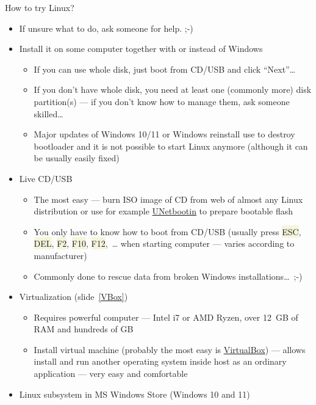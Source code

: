 \documentclass[compress, xelatex, 11pt, xcolor=svgnames, aspectratio=169, url={hyphens, lowtilde}]{beamer}
\renewcommand{\texttt}[1]{\colorbox{Beige}{{\ttfamily #1}}}
\begin{document}

\begin{frame}[allowframebreaks]{How to try Linux?}
	\begin{itemize}
		\item If unsure what to do, ask someone for help. ;-)
		\item Install it on some computer together with or instead of Windows
		\begin{itemize}
			\item If you can use whole disk, just boot from CD/USB and click \enquote{Next}\ldots
			\item If you don't have whole disk, you need at least one (commonly more) disk partition(s) --- if you don't know how to manage them, ask someone skilled\ldots
			\item Major updates of Windows 10/11 or Windows reinstall use to destroy bootloader and it is not possible to start Linux anymore (although it can be usually easily fixed)
		\end{itemize}
		\item Live CD/USB
		\begin{itemize}
			\item The most easy --- burn ISO image of CD from web of almost any Linux distribution or use for example \href{https://unetbootin.github.io/}{UNetbootin} to prepare bootable flash
			\item You only have to know how to boot from CD/USB (usually press \texttt{ESC}, \texttt{DEL}, \texttt{F2}, \texttt{F10}, \texttt{F12},~\ldots{ }when starting computer --- varies according to manufacturer)
			\item Commonly done to rescue data from broken Windows installations\ldots~;-)
		\end{itemize}
		\item Virtualization (slide~\ref{VBox})
		\begin{itemize}
			\item Requires powerful computer --- Intel i7 or AMD Ryzen, over 12~GB of RAM and hundreds of GB
			\item Install virtual machine (probably the most easy is \href{https://www.virtualbox.org/}{VirtualBox}) --- allows install and run another operating system inside host as an ordinary application --- very easy and comfortable
		\end{itemize}
		\item Linux subsystem in MS Windows Store (Windows 10 and 11)

\end{itemize}
\end{frame}
\end{document}
